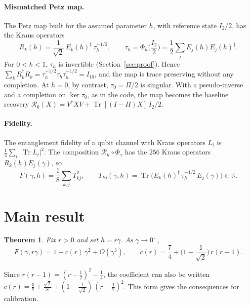 \documentclass[11pt,a4paper]{article}
\theoremstyle{plain}
\newtheorem{theorem}{Theorem}
\newcommand{\cR}{\mathcal{R}}
\DeclareMathOperator{\Tr}{Tr}
\begin{document}
\paragraph{Mismatched Petz map.} The Petz map built for the assumed parameter $h$, with reference state $I_2/2$, has the Kraus operators
\begin{equation}\label{eq:petz}
R_k(h)=\frac1{\sqrt2}\,E_k(h)^\dagger\,\tau_h^{-1/2},\qquad \tau_h=\Phi_h\Big(\frac{I_2}2\Big)=\frac12\sum_jE_j(h)E_j(h)^\dagger .
\end{equation}
For $0<h<1$, $\tau_h$ is invertible (Section~\ref{sec:proof}). Hence $\sum_kR_k^\dagger R_k=\tau_h^{-1/2}\tau_h\tau_h^{-1/2}=I_{16}$, and the map is trace preserving without any completion. At $h=0$, by contrast, $\tau_0=\Pi/2$ is singular. With a pseudo-inverse and a completion on $\ker\tau_0$, as in the code, the map becomes the baseline recovery $\cR_0(X)=V^\dagger XV+\Tr[(I-\Pi)X]\,I_2/2$.

\paragraph{Fidelity.} The entanglement fidelity of a qubit channel with Kraus operators $L_i$ is $\frac14\sum_i|\Tr L_i|^2$. The composition $\cR_h\circ\Phi_\gamma$ has the $256$ Kraus operators $R_k(h)E_j(\gamma)$, so
\begin{equation}\label{eq:F}
F(\gamma,h)=\frac18\sum_{k,j}T_{kj}^2,\qquad T_{kj}(\gamma,h)=\Tr\Big(E_k(h)^\dagger\,\tau_h^{-1/2}\,E_j(\gamma)\Big)\in\mathbb R .
\end{equation}

\section{Main result}

\begin{theorem}\label{thm:main}
Fix $r>0$ and set $h=r\gamma$. As $\gamma\to0^+$,
\begin{equation}\label{eq:main}
\boxed{\;F(\gamma,r\gamma)=1-c(r)\,\gamma^2+O(\gamma^3),\qquad c(r)=\frac74+\Big(1-\frac1{\sqrt2}\Big)\,r(r-1).\;}
\end{equation}
\end{theorem}

Since $r(r-1)=(r-\frac12)^2-\frac14$, the coefficient can also be written $c(r)=\frac32+\frac{\sqrt2}8+(1-\frac1{\sqrt2})\,(r-\frac12)^2$. This form gives the consequences for calibration.
\end{document}
